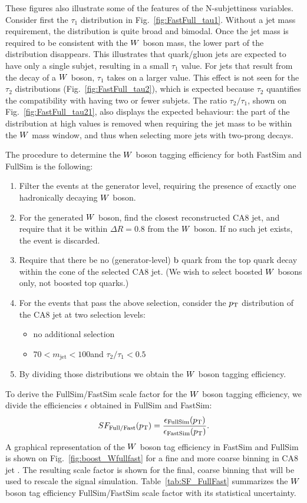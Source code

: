These figures also illustrate some of the features of the N-subjettiness variables.
Consider first the $\tau_1$ distribution in Fig.~\ref{fig:FastFull_tau1}. Without a jet mass
requirement, the distribution is quite broad and bimodal. Once the jet mass is required to
be consistent with the $W$ boson mass, the lower part of the distribution disappears. This
illustrates that quark/gluon jets are expected to have only a single subjet, resulting in a small
$\tau_1$ value. For jets that result from the decay of a $W$ boson, $\tau_1$ takes on a larger
value. 
This effect is not seen for the $\tau_2$ distributions (Fig.~\ref{fig:FastFull_tau2}), which is
expected because $\tau_2$ quantifies the compatibility with having two or fewer subjets. 
The ratio $\tau_2/\tau_1$, shown on Fig.~\ref{fig:FastFull_tau21}, also displays the
expected behaviour: the part of the distribution at high values is removed when requiring the jet
mass to be within the $W$ mass window, and thus when selecting more jets with two-prong decays. 

The procedure to determine the $W$ boson tagging efficiency for both FastSim and FullSim is the
following:
\begin{enumerate}
\item Filter the events at the generator level, requiring the presence of exactly one hadronically
decaying $W$ boson. 
\item For the generated $W$ boson, find the closest reconstructed CA8 jet, and require that it be
within $\Delta R = 0.8$ from the $W$ boson. If no such jet exists, the event is discarded.  
\item Require that there be no (generator-level) $\mathrm{b}$ quark from the top quark decay within the
cone of the selected CA8 jet. (We wish to select boosted $W$ bosons only, not boosted top quarks.)
\item For the events that pass the above selection, consider the $p_{\mathrm{T}}$ distribution of the CA8 jet
at two selection levels:
 \begin{itemize}
   \item no additional selection
   \item $70 < m_\textrm{jet} < 100$\GeV and $\tau_2/\tau_1 < 0.5$
 \end{itemize}
\item By dividing those \pt distributions we obtain the $W$ boson tagging efficiency. 
\end{enumerate}
To derive the FullSim/FastSim scale factor for the $W$ boson tagging efficiency, we divide the
efficiencies $\epsilon$ obtained in FullSim and FastSim:
\begin{equation}
SF_{\textrm{Full/Fast}}(p_{\mathrm{T}}) =
\frac{\epsilon_{\textrm{FullSim}}(p_{\mathrm{T}})}{\epsilon_{\textrm{FastSim}}(p_{\mathrm{T}})}.
\end{equation}
A graphical representation of the $W$ boson tag efficiency in FastSim and FullSim is shown on
Fig.~\ref{fig:boost_Wfullfast} for a fine and more coarse binning in CA8 jet \pt. The resulting
scale factor is shown for the final, coarse binning that will be used to rescale the signal
simulation. 
Table~\ref{tab:SF_FullFast} summarizes the $W$ boson tag efficiency FullSim/FastSim scale factor
with its
statistical uncertainty.

